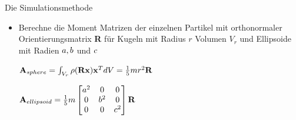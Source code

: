 \documentclass[t]{beamer}
\begin{document}
\begin{frame}{Die Simulationsmethode}
	\begin{itemize}
		\item Berechne die Moment Matrizen der einzelnen Partikel mit orthonormaler Orientierungsmatrix \textbf{R} für Kugeln mit Radius $r$ Volumen $V_r$ und Ellipsoide mit Radien $\mathnormal{a, b}$ und $\mathnormal{c}$ 
		\begin{center}
			$\mathnormal{\mathbf{A}_{sphere}}= \int_{V_r}\rho(\mathbf{Rx})\mathbf{x}^T dV = \frac{1}{5}mr^2\mathbf{R}$
		\end{center}
		\begin{center}	
			$\mathnormal{\mathbf{A}_{ellipsoid}}= \frac{1}{5}m
			\begin{bmatrix}
			a^2& 0& 0 \\
			0& b^2& 0 \\
			0& 0& c^2
			\end{bmatrix}\mathbf{R}$
		\end{center}
	\end{itemize}
\end{frame}
\end{document}
